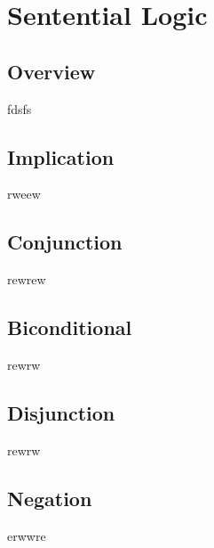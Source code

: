 \chapter{Sentential Logic}

\section{Overview}

fdsfs

\section{Implication}
rweew

\section{Conjunction}
rewrew

\section{Biconditional}
rewrw

\section{Disjunction}

rewrw
\section{Negation}

erwwre
